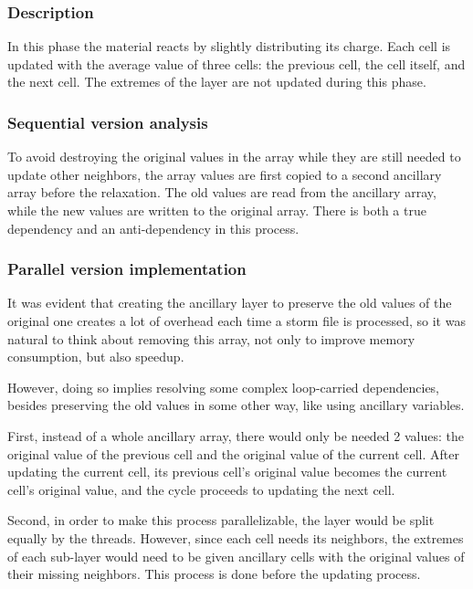 \subsubsection{Description}

In this phase the material reacts by slightly distributing its charge. Each cell is updated with the average value of three cells: the previous cell, the cell itself, and the next cell. The extremes of the layer are not updated during this phase.

\subsubsection{Sequential version analysis}
To avoid destroying the original values in the array while they are still needed to update other neighbors, the array values are first copied to a second ancillary array before the relaxation. The old values are read from the ancillary array, while the new values are written to the original array.
There is both a true dependency and an anti-dependency in this process.

\subsubsection{Parallel version implementation}

It was evident that creating the ancillary layer to preserve the old values of the original one creates a lot of overhead each time a storm file is processed, so it was natural to think about removing this array, not only to improve memory consumption, but also speedup. 

However, doing so implies resolving some complex loop-carried dependencies, besides preserving the old values in some other way, like using ancillary variables.

First, instead of a whole ancillary array, there would only be needed 2 values: the original value of the previous cell and the original value of the current cell. After updating the current cell, its previous cell's original value becomes the current cell's original value, and the cycle proceeds to updating the next cell.

Second, in order to make this process parallelizable, the layer would be split equally by the threads. However, since each cell needs its neighbors, the extremes of each sub-layer would need to be given ancillary cells with the original values of their missing neighbors. This process is done before the updating process.